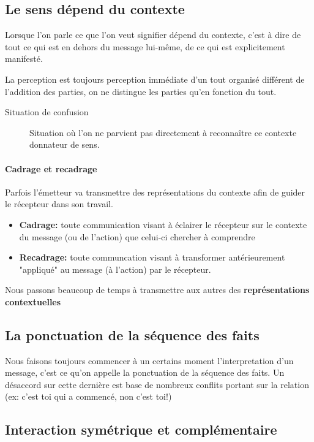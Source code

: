 \documentclass[11pt]{article} %
\begin{document}
	\subsection{Le sens dépend du contexte}

	Lorsque l'on parle ce que l'on veut signifier dépend du contexte, c'est à dire de tout ce qui est en dehors du message lui-même, de ce qui est explicitement manifesté.

	La perception est toujours perception immédiate d'un tout organisé différent de l'addition des parties, on ne distingue les parties qu'en fonction du tout.

	\begin{description}
		\item[Situation de confusion] Situation où l'on ne parvient pas directement à reconnaître ce contexte donnateur de sens.
	\end{description}

	\paragraph{Cadrage et recadrage} Parfois l'émetteur va transmettre des représentations du contexte afin de guider le récepteur dans son travail.
	\begin{itemize}
		\item \textbf{Cadrage:} toute communication visant à éclairer le récepteur sur le contexte du message (ou de l'action) que celui-ci chercher à comprendre
		\item \textbf{Recadrage:} toute communcation visant à transformer  antérieurement "appliqué" au message (à l'action) par le récepteur. 
	\end{itemize}
	
	Nous passons beaucoup de temps à transmettre aux autres des \textbf{représentations contextuelles}

	\subsection{La ponctuation de la séquence des faits}

		Nous faisons toujours commencer à un certains moment l'interpretation d'un message, c'est ce qu'on appelle la ponctuation de la séquence des faits. Un désaccord sur cette dernière est base de nombreux conflits portant sur la relation (ex: c'est toi qui a commencé, non c'est toi!)

	\subsection{Interaction symétrique et complémentaire}
\end{document}
